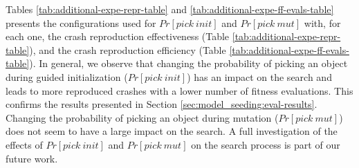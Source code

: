 Tables \ref{tab:additional-expe-repr-table} and \ref{tab:additional-expe-ff-evals-table} presents the configurations used for $Pr[pick\ init]$ and $Pr[pick\ mut]$ with, for each one, the crash reproduction effectiveness (Table \ref{tab:additional-expe-repr-table}), and the crash reproduction efficiency (Table \ref{tab:additional-expe-ff-evals-table}). In general, we observe that changing the probability of picking an object during guided initialization ($Pr[pick\ init]$) has an impact on the search and leads to more reproduced crashes with a lower number of fitness evaluations. This confirms the results presented in Section \ref{sec:model_seeding:eval-results}.
Changing the probability of picking an object during mutation ($Pr[pick\ mut]$) does not seem to have a large impact on the search.
A full investigation of the effects of $Pr[pick\ init]$ and $Pr[pick\ mut]$ on the search process is part of our future work.



